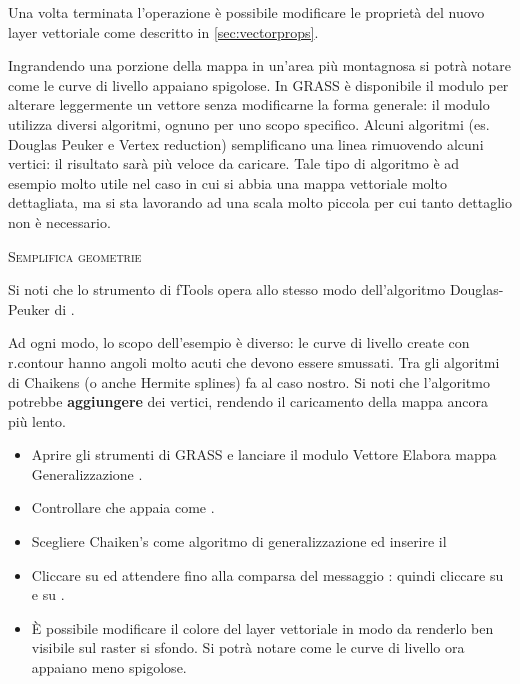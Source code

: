 Una volta terminata l'operazione è possibile modificare le proprietà del nuovo layer 
vettoriale come descritto in \ref{sec:vectorprops}.

Ingrandendo una porzione della mappa in un'area più montagnosa si potrà 
notare come le curve di livello appaiano spigolose. In GRASS è disponibile 
il modulo  per alterare leggermente un vettore senza 
modificarne la forma generale: il modulo utilizza diversi algoritmi, ognuno per 
uno scopo specifico. Alcuni algoritmi (es. Douglas Peuker e Vertex reduction) 
semplificano una linea rimuovendo alcuni vertici: il risultato sarà più veloce 
da caricare. Tale tipo di algoritmo è ad esempio molto utile nel caso in cui si 
abbia una mappa vettoriale molto dettagliata, ma si sta lavorando ad una scala 
molto piccola per cui tanto dettaglio non è necessario.

\begin{Tip}\caption{\textsc{Semplifica geometrie}}
Si noti che lo strumento  di fTools 
opera allo stesso modo dell'algoritmo Douglas-Peuker di . 
\end{Tip}  

Ad ogni modo, lo scopo dell'esempio è diverso: le curve di livello create con r.contour 
hanno angoli molto acuti che devono essere smussati. Tra gli algoritmi di 
 Chaikens (o anche Hermite splines) fa al caso nostro. 
Si noti che l'algoritmo potrebbe \textbf{aggiungere} dei vertici, rendendo il caricamento 
della mappa ancora più lento.

\begin{itemize}[label=--]
\item Aprire gli strumenti di GRASS e lanciare il modulo Vettore \arrow
Elabora mappa \arrow Generalizzazione \arrow {}.
\item Controllare che  appaia come 
. 
\item Scegliere Chaiken's come algoritmo di generalizzazione ed inserire il
\item Cliccare su  ed attendere fino alla comparsa del messaggio 
: quindi cliccare su  
e su . 
\item È possibile modificare il colore del layer vettoriale in modo da renderlo ben 
visibile sul raster si sfondo. Si potrà notare come le curve di livello ora appaiano
meno spigolose.
\end{itemize}

